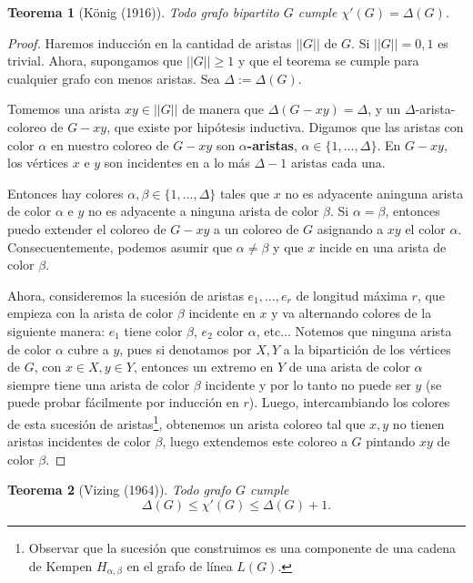 \documentclass[12pt]{report}
\theoremstyle{plain}
\newtheorem{theorem}{Teorema}[section]
\theoremstyle{definition}
\newcommand{\Abs}[1]{\left \vert \left \vert #1 \right \vert \right \vert}
\begin{document}
\begin{theorem}[König (1916)]
Todo grafo bipartito $G$ cumple $\chi' (G) = \Delta (G)$.
\end{theorem}
\begin{proof}
Haremos inducción en la cantidad de aristas $\Abs G$ de $G$. Si $\Abs G = 0,1$ es trivial. Ahora, supongamos que $\Abs G \geq 1$ y que el teorema se cumple para cualquier grafo con menos aristas. Sea $\Delta := \Delta (G)$.

Tomemos una arista $xy \in \Abs{G}$ de manera que $\Delta (G -xy) = \Delta$, y un $\Delta$-arista-coloreo de $G - xy$, que existe por hipótesis inductiva. Digamos que las aristas con color $\alpha$ en nuestro coloreo de $G - xy$ son \textbf{$\alpha$-aristas}, $\alpha \in \{1, \ldots, \Delta\}$. En $G - xy$, los vértices $x$ e $y$ son incidentes en a lo más $\Delta -1$ aristas cada una.


Entonces hay colores $\alpha, \beta \in \{1,\ldots,\Delta\}$ tales que $x $ no es adyacente aninguna arista de color $\alpha$ e $y$ no es adyacente a ninguna arista de color $\beta$. Si $\alpha = \beta$, entonces puedo extender el coloreo de $G-xy$ a un coloreo de $G$ asignando a $xy$ el color $\alpha$. Consecuentemente, podemos asumir que $\alpha \neq \beta$ y que $x$ incide en una arista de color $\beta$.

Ahora, consideremos la sucesión de aristas $e_1, \ldots, e_r$ de longitud máxima $r$, que empieza con la arista de color $\beta$ incidente en $x$ y va alternando colores de la siguiente manera: $e_1$ tiene color $\beta$, $e_2$ color $\alpha$, etc... Notemos que ninguna arista de color $\alpha$ cubre a $y$, pues si denotamos por $X,Y$ a la bipartición de los vértices de $G$, con $x \in X, y \in Y$, entonces un extremo en $Y$ de una arista de color $\alpha$ siempre tiene una arista de color $\beta$ incidente y por lo tanto no puede ser $y$ (se puede probar fácilmente por inducción en $r$). Luego, intercambiando los colores de esta sucesión de aristas\footnote{Observar que la sucesión que construimos es una componente de una cadena de Kempen $H_{\alpha, \beta}$ en el grafo de línea $L(G)$.}, obtenemos un arista coloreo tal que $x,y$ no tienen aristas incidentes de color $\beta$, luego extendemos este coloreo a $G$ pintando $xy$ de color $\beta$.
\end{proof}



\begin{theorem}[Vizing (1964)]
Todo grafo $G$ cumple
\[
    \boxed{\Delta (G) \leq \chi ' (G) \leq \Delta (G) +1 .}
\]
\end{theorem}
\end{document}
